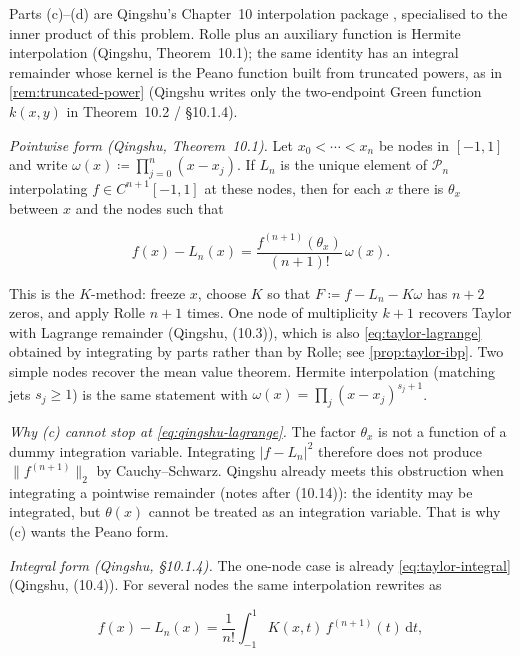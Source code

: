 \documentclass[11pt,a4paper]{article}
\begin{document}
\begin{remark}
\label{rem:p2-qingshu-interp}
Parts (c)--(d) are Qingshu's Chapter~10 interpolation package \cite{qingshu11}, specialised to the inner product of this problem. Rolle plus an auxiliary function is Hermite interpolation (Qingshu, Theorem~10.1); the same identity has an integral remainder whose kernel is the Peano function built from truncated powers, as in \cref{rem:truncated-power} (Qingshu writes only the two-endpoint Green function \(k(x,y)\) in Theorem~10.2 / \S10.1.4).

\emph{Pointwise form (Qingshu, Theorem~10.1).}
Let \(x_{0}<\cdots<x_{n}\) be nodes in \([-1,1]\) and write \(\omega(x)\coloneqq\prod_{j=0}^{n}(x-x_{j})\). If \(L_{n}\) is the unique element of \(\mathcal{P}_{n}\) interpolating \(f\in C^{n+1}[-1,1]\) at these nodes, then for each \(x\) there is \(\theta_{x}\) between \(x\) and the nodes such that

\begin{equation}
\label{eq:qingshu-lagrange}
f(x)-L_{n}(x)
=
\frac{f^{(n+1)}(\theta_{x})}{(n+1)!}\,\omega(x).
\end{equation}

This is the \(K\)-method: freeze \(x\), choose \(K\) so that \(F\coloneqq f-L_{n}-K\omega\) has \(n+2\) zeros, and apply Rolle \(n+1\) times. One node of multiplicity \(k+1\) recovers Taylor with Lagrange remainder (Qingshu, (10.3)), which is also \eqref{eq:taylor-lagrange} obtained by integrating by parts rather than by Rolle; see \cref{prop:taylor-ibp}. Two simple nodes recover the mean value theorem. Hermite interpolation (matching jets \(s_{j}\geqslant 1\)) is the same statement with \(\omega(x)=\prod_{j}(x-x_{j})^{s_{j}+1}\).

\emph{Why (c) cannot stop at \eqref{eq:qingshu-lagrange}.}
The factor \(\theta_{x}\) is not a function of a dummy integration variable. Integrating \(\lvert f-L_{n}\rvert^{2}\) therefore does not produce \(\lVert f^{(n+1)}\rVert_{2}\) by Cauchy--Schwarz. Qingshu already meets this obstruction when integrating a pointwise remainder (notes after (10.14)): the identity may be integrated, but \(\theta(x)\) cannot be treated as an integration variable. That is why (c) wants the Peano form.

\emph{Integral form (Qingshu, \S10.1.4).}
The one-node case is already \eqref{eq:taylor-integral} (Qingshu, (10.4)). For several nodes the same interpolation rewrites as

\begin{equation}
\label{eq:qingshu-peano}
f(x)-L_{n}(x)
=
\frac{1}{n!}
\int_{-1}^{1} K(x,t)\,f^{(n+1)}(t)\,\mathrm{d}t,
\end{equation}


\end{remark}
\end{document}
